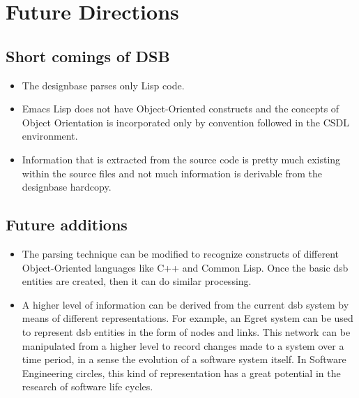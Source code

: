\section{Future Directions}


\subsection{Short comings of DSB}
\begin{itemize}
\item The designbase parses only Lisp code.
  
\item Emacs Lisp does not have Object-Oriented constructs and the
  concepts of Object Orientation is incorporated only by convention
  followed in the CSDL environment.
  
\item Information that is extracted from the source code is pretty
  much existing within the source files and not much information is
  derivable from the designbase hardcopy.
\end{itemize}

\subsection{Future additions}

\begin{itemize}
\item The parsing technique can be modified to recognize constructs of
  different Object-Oriented languages like C++ and Common Lisp.  Once
  the basic dsb entities are created, then it can do similar processing.
  
\item A higher level of information can be derived from the current
  dsb system by means of different representations.  For example, an
  Egret system can be used to represent dsb entities in the form of
  nodes and links.  This network can be manipulated from a higher level
  to record changes made to a system over a time period, in a sense the
  evolution of a software system itself.  In Software Engineering
  circles, this kind of representation has a great potential in the
  research of software life cycles.
\end{itemize}



